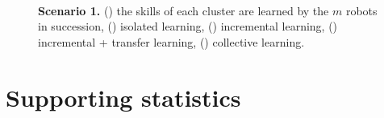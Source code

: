 \begin{figure}[!h]
	\hspace*{\fill}
	\\
	\hspace*{\fill}
	\hspace*{\fill}
	\caption[] {\label{fig:collective_learning} \textbf{Scenario 1.} () the skills of each cluster are learned by the $ m$ robots in succession, () isolated learning, () incremental learning,  () incremental + transfer learning, () collective learning.}
\end{figure}


\newpage
\section{Supporting statistics}
